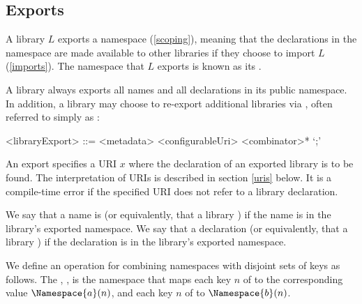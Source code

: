 \documentclass[makeidx]{article}
\begin{document}
{\subsection{Exports}

\LMHash{}%
A library $L$ exports a namespace (\ref{scoping}), meaning that
the declarations in the namespace are made available to other libraries
if they choose to import $L$ (\ref{imports}).
The namespace that $L$ exports is known as its
.

\LMHash{}%
A library always exports all names and all declarations in its public namespace.
In addition, a library may choose to re-export additional libraries
via , often referred to simply as :

\begin{grammar}
<libraryExport> ::= <metadata> \EXPORT{} <configurableUri> <combinator>* `;'
\end{grammar}

\LMHash{}%
An export specifies a URI $x$
where the declaration of an exported library is to be found.
The interpretation of URIs is described in section \ref{uris} below.
It is a compile-time error if the specified URI
does not refer to a library declaration.

\LMHash{}%
We say that a name is 
(or equivalently, that a library
)
if the name is in the library's exported namespace.
We say that a declaration 
(or equivalently, that a library
)
if the declaration is in the library's exported namespace.

\LMHash{}%
We define an operation for
combining namespaces with disjoint sets of keys as follows.
The
,
,
is the namespace that maps
each key $n$ of 
to the corresponding value $\Namespace{a}(n)$,
and each key $n$ of 
to $\Namespace{b}(n)$.


}
\end{document}
